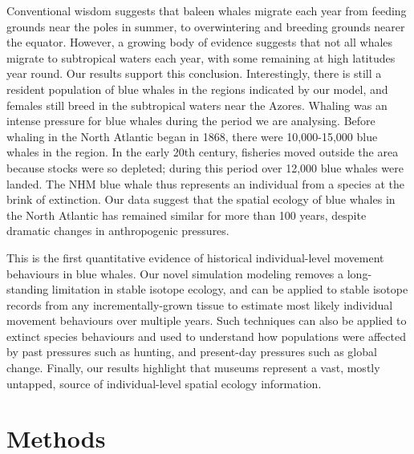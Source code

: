 \documentclass[a4paper,12pt]{article}
\begin{document}

 
Conventional wisdom suggests that baleen whales migrate each year from feeding grounds near the poles in summer, to overwintering and breeding grounds nearer the equator\cite{corkeron1999baleen,lockyer1981migration}. 
However, a growing body of evidence suggests that not all whales migrate to subtropical waters each year, with some remaining at high latitudes year round\cite{mcdonald2006biogeographic}. 
Our results support this conclusion. 
Interestingly, there is still a resident population of blue whales in the regions indicated by our model, and females still breed in the subtropical waters near the Azores\cite{reilly2008balaenoptera}. 
Whaling was an intense pressure for blue whales during the period we are analysing. 
Before whaling in the North Atlantic began in 1868\cite{reilly2008balaenoptera}, there were 10,000-15,000 blue whales in the region\cite{sigurjonsson1995life}. 
In the early 20th century, fisheries moved outside the area because stocks were so depleted\cite{reilly2008balaenoptera}; during this period over 12,000 blue whales were landed\cite{sigurjonsson1995life}. 
The NHM blue whale thus represents an individual from a species at the brink of extinction.
Our data suggest that the spatial ecology of blue whales in the North Atlantic has remained similar for more than 100 years, despite dramatic changes in anthropogenic pressures.

This is the first quantitative evidence of historical individual-level movement behaviours in blue whales. 
Our novel simulation modeling removes a long-standing limitation in stable isotope ecology, and can be applied to stable isotope records from any incrementally-grown tissue to estimate most likely individual movement behaviours over multiple years. 
Such techniques can also be applied to extinct species behaviours and used to understand how populations were affected by past pressures such as hunting, and present-day pressures such as global change. 
Finally, our results highlight that museums represent a vast, mostly untapped, source of individual-level spatial ecology information.

\section{Methods}
\end{document}
